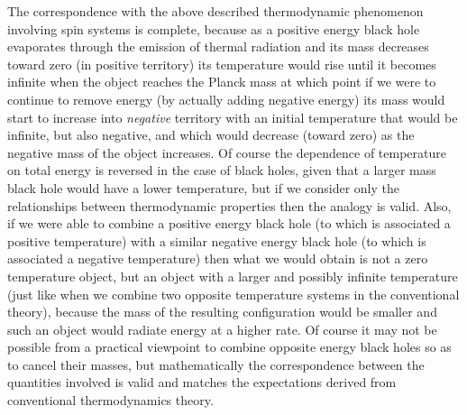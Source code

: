 \documentclass[notitlepage,12pt]{report}
\begin{document}
The correspondence with the above described thermodynamic phenome\-non involving spin systems is complete, because as a positive energy black hole evaporates through the emission of thermal radiation and its mass decreases toward zero (in positive territory) its temperature would rise until it becomes infinite when the object reaches the Planck mass at which point if we were to continue to remove energy (by actually adding negative energy) its mass would start to increase into \textit{negative} territory with an initial temperature that would be infinite, but also negative, and which would decrease (toward zero) as the negative mass of the object increases. Of course the dependence of temperature on total energy is reversed in the case of black holes, given that a larger mass black hole would have a lower temperature, but if we consider only the relationships between thermodynamic properties then the analogy is valid. Also, if we were able to combine a positive energy black hole (to which is associated a positive temperature) with a similar negative energy black hole (to which is associated a negative temperature) then what we would obtain is not a zero temperature object, but an object with a larger and possibly infinite temperature (just like when we combine two opposite temperature systems in the conventional theory), because the mass of the resulting configuration would be smaller and such an object would radiate energy at a higher rate. Of course it may not be possible from a practical viewpoint to combine opposite energy black holes so as to cancel their masses, but mathematically the correspondence between the quantities involved is valid and matches the expectations derived from conventional thermodynamics theory.
\end{document}
